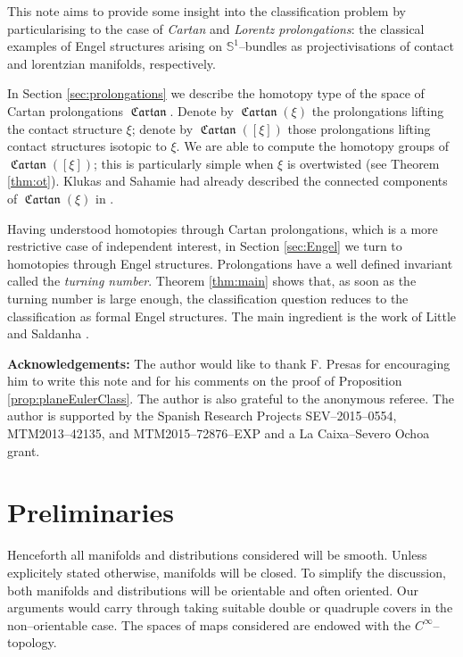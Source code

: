\documentclass[10pt]{amsart}
\newcommand{\Cartan}{\operatorname{\mathfrak{Cartan}}}
\theoremstyle{definition}
\begin{document}
This note aims to provide some insight into the classification problem by particularising to the case of \textsl{Cartan} and \textsl{Lorentz prolongations}: the classical examples of Engel structures arising on $\mathbb{S}^1$--bundles as projectivisations of contact and lorentzian manifolds, respectively. 

In Section \ref{sec:prolongations} we describe the homotopy type of the space of Cartan prolongations $\Cartan$. Denote by $\Cartan(\xi)$ the prolongations lifting the contact structure $\xi$; denote by $\Cartan([\xi])$ those prolongations lifting contact structures isotopic to $\xi$. We are able to compute the homotopy groups of $\Cartan([\xi])$; this is particularly simple when $\xi$ is overtwisted (see Theorem \ref{thm:ot}). Klukas and Sahamie had already described the connected components of $\Cartan(\xi)$ in \cite{KS}.

Having understood homotopies through Cartan prolongations, which is a more restrictive case of independent interest, in Section \ref{sec:Engel} we turn to homotopies through Engel structures. Prolongations have a well defined invariant called the \textsl{turning number}. Theorem \ref{thm:main} shows that, as soon as the turning number is large enough, the classification question reduces to the classification as formal Engel structures. The main ingredient is the work of Little \cite{Li} and Saldanha \cite{Sal}.

\textbf{Acknowledgements:} The author would like to thank F. Presas for encouraging him to write this note and for his comments on the proof of Proposition \ref{prop:planeEulerClass}. The author is also grateful to the anonymous referee. The author is supported by the Spanish Research Projects SEV--2015--0554, MTM2013--42135, and MTM2015--72876--EXP and a La Caixa--Severo Ochoa grant.


\section{Preliminaries} \label{sec:preliminaries}

Henceforth all manifolds and distributions considered will be smooth. Unless explicitely stated otherwise, manifolds will be closed. To simplify the discussion, both manifolds and distributions will be orientable and often oriented. Our arguments would carry through taking suitable double or quadruple covers in the non--orientable case. The spaces of maps considered are endowed with the $C^\infty$--topology.
\end{document}
